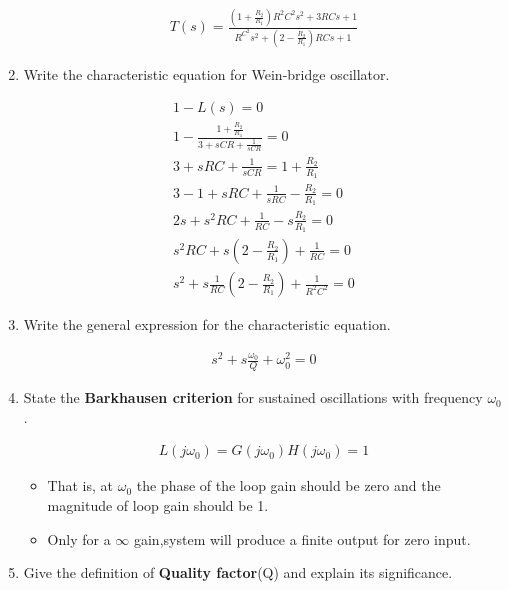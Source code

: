 \begin{enumerate}[label=\arabic*.,ref=\theenumi]
\solution
\begin{align}
T(s) = \frac{(1+\frac{R_2}{R_1}) R^2C^2s^2+3RCs+1 }{R^C^2s^2+(2-\frac{R_2}{R_1})RCs+1} \label{eq:ee18btech11044_3_7}
\end{align}





\item Write the characteristic equation for Wein-bridge oscillator.

\solution
\begin{align}
    1 - L(s) = 0  \\
    1 - \frac{1 + \frac{R_2}{R_1}}{3 + sCR + \frac{1}{sCR}} = 0  \\
    3 + sRC + \frac{1}{sCR} = 1 + \frac{R_2}{R_1}  \\
    3 - 1 +sRC +\frac{1}{sRC} -\frac{R_2}{R_1} = 0  \\
    2s + s^2 RC + \frac{1}{RC} -s\frac{R_2}{R_1} = 0  \\
    s^2 RC + s(2 - \frac{R_2}{R_1}) + \frac{1}{RC} =0 \\
    s^2 + s \frac{1}{RC}(2-\frac{R_2}{R_1}) + \frac{1}{R^2C^2} = 0 \label{eq:ee18btech11044_3_3}
\end{align}

\item
Write the general expression for the characteristic equation.

\solution
\begin{align}
    s^2 + s\frac{\omega_0}{Q} + \omega_0^2 = 0 \label{eq:ee18btech11044_3_4}
\end{align}

\item State the \textbf{Barkhausen criterion} for sustained oscillations with frequency $\omega_0$.

\solution
\begin{align}
    L(j\omega_0) = G(j\omega_0)  H(j\omega_0) = 1
\end{align}
\begin{itemize}
    \item That is, at $\omega_0$ the phase of the loop gain should be zero and the magnitude of loop gain should be 1.
    \item Only for a $\infty$ gain,system will produce a finite output for zero input. 
\end{itemize}

\item Give the definition of \textbf{Quality factor}(Q) and explain its significance.


\end{enumerate}
